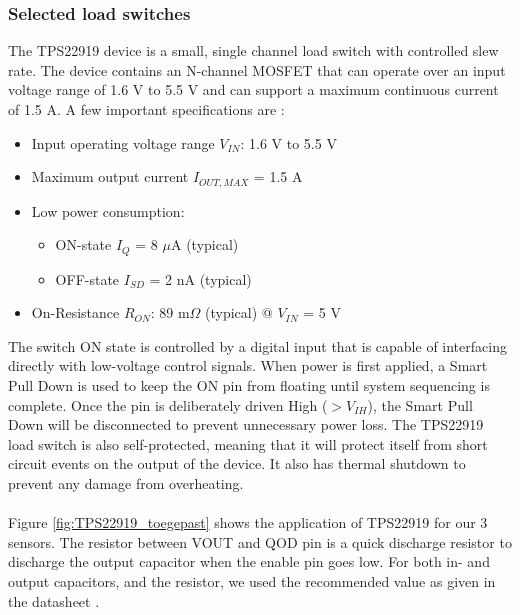 \documentclass[11pt,a4paper]{article}
\begin{document}
\subsubsection{Selected load switches}
The TPS22919 device is a small, single channel load switch with controlled slew rate. The device contains an N-channel MOSFET that can operate over an input voltage range of 1.6 V to 5.5 V and can support a maximum continuous current of 1.5 A. A few important specifications are \cite{bib:TPS22919}:
\begin{itemize}
	\item Input operating voltage range $V_{IN}$: 1.6 V to 5.5 V
	\item Maximum output current $I_{OUT,MAX}$ = 1.5 A
	\item Low power consumption:
	\begin{itemize}
		\item ON-state $I_Q$ = 8 $\mu$A (typical)
		\item OFF-state $I_{SD}$ = 2 nA (typical)
	\end{itemize}
	\item On-Resistance $R_{ON}$: 89 m$\Omega$ (typical) @ $V_{IN}$ = 5 V
\end{itemize}
The switch ON state is controlled by a digital input that is capable of interfacing directly with low-voltage control signals. When power is first applied, a Smart Pull Down is used to keep the ON pin from floating until system sequencing is complete. Once the pin is deliberately driven High ($> V_{IH}$), the Smart Pull Down will be disconnected to prevent unnecessary power loss. The TPS22919 load switch is also self-protected, meaning that it will protect itself from short circuit events on the output of the device. It also has thermal shutdown to prevent any damage from overheating.
\\ \\
Figure \ref{fig:TPS22919_toegepast} shows the application of TPS22919 for our 3 sensors. The resistor between VOUT and QOD pin is a quick discharge resistor to discharge the output capacitor when the enable pin goes low. For both in- and output capacitors, and the resistor, we used the recommended value as given in the datasheet \cite{bib:TPS22919}.
\end{document}
